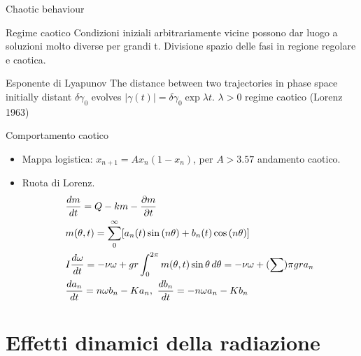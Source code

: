 \begin{frame}{Chaotic behaviour}
\begin{block}{Regime caotico}
Condizioni iniziali arbitrariamente vicine possono dar luogo a soluzioni molto diverse per grandi t.
Divisione spazio delle fasi in regione regolare e caotica.
\end{block}
\begin{block}{Esponente di Lyapunov}
The distance between two trajectories in phase space initially distant $\delta \gamma_0$ evolves $|\gamma(t)|=\delta\gamma_0\exp{\lambda t}$. $\lambda>0$ regime caotico (Lorenz 1963)

\end{block}
\end{frame}

\begin{wordonframe}{Comportamento caotico}
\begin{itemize}\item Mappa logistica: $x_{n+1}=Ax_n(1-x_n)$, per $A>3.57$ andamento caotico.
\item Ruota di Lorenz.
\begin{align*}
&\TDy{t}{m}=Q-km-\PDy{t}{m}\\
&m(\theta,t)=\sum_0^{\infty}[a_n(t)\sin{(n\theta)}+b_n(t)\cos{(n\theta)}]\\
&I\TDy{t}{\omega}=-\nu\omega+gr\int_0^{2\pi}m(\theta,t)\sin{\theta}\,d\theta=-\nu\omega+(\sum)\pi gra_n\\
&\TDy{t}{a_n}=n\omega b_n-Ka_n,\ \TDy{t}{b_n}=-n\omega a_n-Kb_n
\end{align*}
\end{itemize}
\end{wordonframe}


\section{Effetti dinamici della radiazione}

